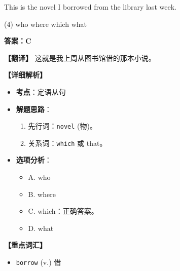 \documentclass[11pt, a4paper]{article}
\newcommand{\analysis}[4]{
    \begin{solutionbox}
        \textbf{答案：#1}
        
        \textbf{【翻译】} #2
        
        \textbf{【详细解析】}
        #3
        
        \textbf{【重点词汇】}
        #4
    \end{solutionbox}
}
\newcommand{\blank}{\underline{\hspace{1.5cm}}}
\begin{document}
\begin{questions}
    \item This is the novel \blank I borrowed from the library last week.
    \begin{tasks}(4)
        \task who \task where \task which \task what
    \end{tasks}
    \analysis{C}{这就是我上周从图书馆借的那本小说。}{
        \begin{itemize}
            \item \textbf{考点}：定语从句
            \item \textbf{解题思路}：
                \begin{enumerate}
                    \item 先行词：\texttt{novel} (物)。
                    \item 关系词：\texttt{which} 或 that。
                \end{enumerate}
            \item \textbf{选项分析}：
                \begin{itemize}
                    \item A. who
                    \item B. where
                    \item C. which：正确答案。
                    \item D. what
                \end{itemize}
        \end{itemize}
    }{
        \begin{itemize}
            \item \texttt{borrow} (v.) 借
        \end{itemize}
    }


\end{questions}
\end{document}
